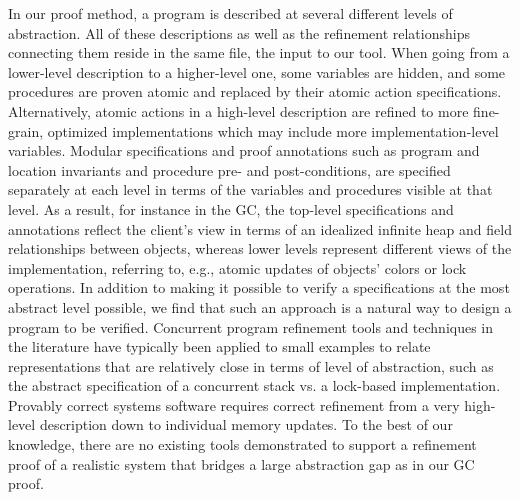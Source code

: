 In our proof method, a program is described at several different levels of abstraction. 
All of these descriptions as well as the refinement relationships connecting them reside in the same \civl file, the input to our tool. 
When going from a lower-level description to a higher-level one, some variables are hidden, and some procedures are proven atomic and replaced by their atomic action specifications. 
Alternatively, atomic actions in a high-level description are refined to more fine-grain, optimized implementations which may include more implementation-level variables. 
Modular specifications and proof annotations such as program and location invariants and procedure pre- and post-conditions, are specified separately at each level in terms of the variables and procedures visible at that level. 
As a result, for instance in the GC, the top-level specifications and annotations reflect the client's view in terms of an idealized infinite heap and field relationships between objects, 
 whereas lower levels represent different views of the implementation, referring to, e.g., atomic updates of objects' colors or lock operations.
In addition to making it possible to verify a specifications at the most abstract level possible, we find that such an approach is a natural way to design a program to be verified. 
Concurrent program refinement tools and techniques in the literature have typically been applied to small examples to relate representations that are relatively close in terms of level of abstraction, such as the abstract specification of a concurrent stack vs. a lock-based implementation. 
Provably correct systems software requires correct refinement from a very high-level description down to individual memory updates. To the best of our knowledge, there are no existing tools demonstrated to support a refinement proof of a realistic system that bridges a large abstraction gap as in our GC proof. 

